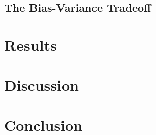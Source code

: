 \documentclass[reprint, english, nofootinbib]{revtex4-2}
\begin{document}
    \subsection{The Bias-Variance Tradeoff}

\section{Results}

\section{Discussion}

\section{Conclusion}

\onecolumngrid

\newpage
\twocolumngrid
\appendix
\end{document}

